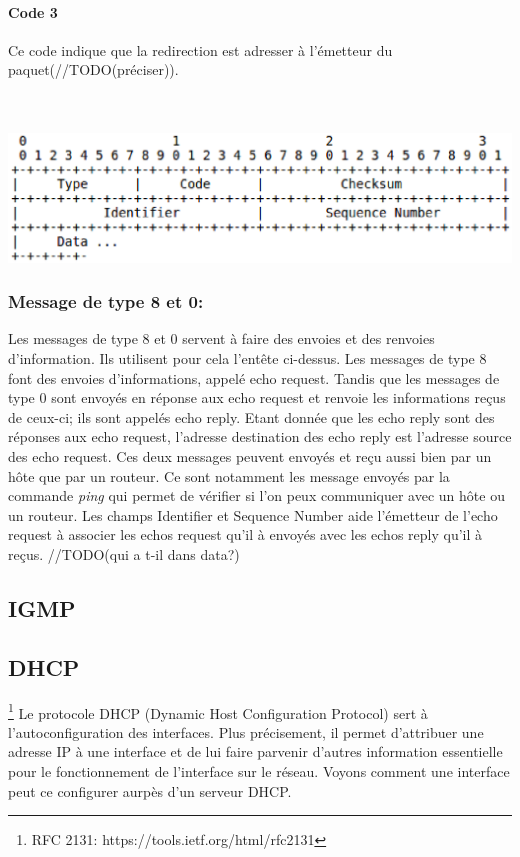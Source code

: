 \documentclass[twoside,openright,a4paper,11pt,french]{article}
\begin{document}
\paragraph{Code 3}
Ce code indique que la redirection est adresser à l'émetteur du paquet(//TODO(préciser)).

\\
\\
\includegraphics[width=15cm]{./pics/header3.eps}
\\

\subsubsection{Message de type 8 et 0:}
Les messages de type 8 et 0 servent à faire des envoies et des renvoies d'information. Ils utilisent pour cela l'entête ci-dessus. Les messages de type 8 font des envoies d'informations, appelé echo request. Tandis que les messages de type 0 sont envoyés en réponse aux echo request et renvoie les informations reçus de ceux-ci; ils sont appelés echo reply. Etant donnée que les echo reply sont des réponses aux echo request, l'adresse destination des echo reply est l'adresse source des echo request. Ces deux messages peuvent envoyés et reçu aussi bien par un hôte que par un routeur. Ce sont notamment les message envoyés par la commande {\it ping} qui permet de vérifier si l'on peux communiquer avec un hôte ou un routeur.
Les champs Identifier et Sequence Number aide l'émetteur de l'echo request à associer les echos request qu'il à envoyés avec les echos reply qu'il à reçus.
//TODO(qui a t-il dans data?)
\subsection{IGMP}


\subsection{DHCP}
\footnote{RFC 2131: https://tools.ietf.org/html/rfc2131}
Le protocole DHCP (Dynamic Host Configuration Protocol) sert à l'autoconfiguration des interfaces. Plus précisement, il  permet d'attribuer une adresse IP à une interface et de lui faire parvenir d'autres information essentielle pour le fonctionnement de l'interface sur le réseau.
Voyons comment une interface peut ce configurer aurpès d'un serveur DHCP.
\end{document}
